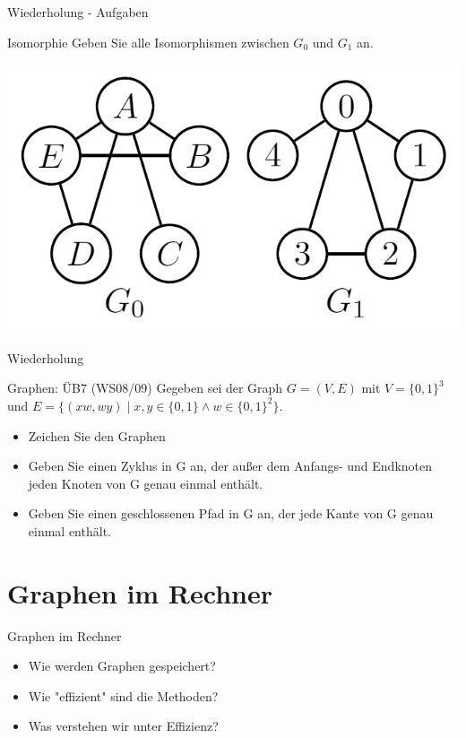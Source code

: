 	
	
	\begin{frame} {Wiederholung - Aufgaben}
		\begin{block}{Isomorphie}
			Geben Sie alle Isomorphismen zwischen $G_0$ und $G_1$ an.
			\begin{center}
				\includegraphics[scale=0.4]{graphics/08/isomorphie.png}
			\end{center}					 
		\end{block}
	\end{frame}
	
	
	
	\begin{frame} {Wiederholung}
		\begin{block} {Graphen: ÜB7 (WS08/09)}
			Gegeben sei der Graph $G = (V,E)$ mit $V = \{0,1\}^3$ und $E = \{(xw, wy)\;|\;x,y \in \{0,1\} \land w \in \{0,1\}^2\}$.
			
			\begin{itemize}
				\item Zeichen Sie den Graphen
				\item Geben Sie einen Zyklus in G an, der außer dem 
					Anfangs- und Endknoten jeden Knoten von G genau einmal enthält.
				\item Geben Sie einen geschlossenen Pfad in G an, 
					der jede Kante von G genau einmal enthält.
			\end{itemize}
		\end{block}
	\end{frame}
	
	
	\section{Graphen im Rechner}
	\begin{frame}{Graphen im Rechner}
		\begin{itemize}
			\item Wie werden Graphen gespeichert?
			\item Wie "effizient" sind die Methoden?
			\item Was verstehen wir unter Effizienz?
		\end{itemize}
	\end{frame}
	
